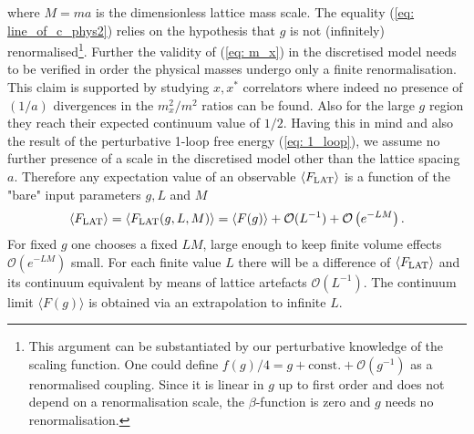 where $M=ma$ is the dimensionless lattice mass scale. The equality (\ref{eq: line_of_c_phys2}) relies on the hypothesis that $g$ is not (infinitely) renormalised\footnote{This argument can be substantiated by our perturbative knowledge of the scaling function. One could define $f(g)/4 = g + \text{const.} + \mathcal{O}(g^{-1})$ as a renormalised coupling. Since it is linear in $g$ up to first order and does not depend on a renormalisation scale, the $\beta$-function is zero and $g$ needs no renormalisation.}. Further the validity of (\ref{eq: m_x}) in the discretised model needs to be verified in order the physical masses undergo only a finite renormalisation. This claim is supported by studying $x,x^{*}$ correlators where indeed no presence of $(1/a)$ divergences in the $m_{x}^{2}/m^{2}$ ratios can be found. Also for the large $g$ region they reach their expected continuum value of $1/2$. Having this in mind and also the result of the perturbative 1-loop free energy (\ref{eq: 1_loop}), we assume no further presence of a scale in the discretised model other than the lattice spacing $a$. Therefore any expectation value of an observable $\langle F_{\rm LAT}\rangle$ is a function of the "bare" input parameters $g,L$ and $M$
%
%
\begin{equation}
\langle F_{\rm LAT}\rangle = \langle F_{\rm LAT}(g,L,M)\rangle = \langle F(g) \rangle + \mathcal{O}(L^{-1}) + \mathcal{O}\left( e^{-LM}\right).
\label{eq: F_LAT}
\end{equation}
%
%
For fixed $g$ one chooses a fixed $LM$, large enough to keep finite volume effects $\mathcal{O}\left( e^{-LM}\right)$ small. For each finite value $L$ there will be a difference of $\langle F_{\rm LAT}\rangle$ and its continuum equivalent by means of lattice artefacts $\mathcal{O}(L^{-1})$. The continuum limit $\langle F(g) \rangle$ is obtained via an extrapolation to infinite $L$.
%
%
%
%
%
%
%
%
%
